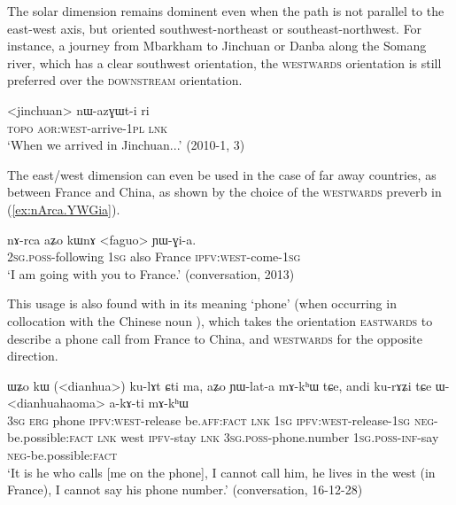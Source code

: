 The solar dimension remains dominent even when the path is not parallel to the east-west axis, but oriented southwest-northeast or southeast-northwest. For instance, a journey from Mbarkham to Jinchuan or Danba along the Somang river, which has a clear southwest orientation, the \textsc{westwards} orientation is still preferred over the \textsc{downstream} orientation.

\begin{exe}
\ex \label{ex:jinchuan.nazGWti}
\gll  <jinchuan> nɯ-azɣɯt-i ri \\
\textsc{topo} \textsc{aor}:\textsc{west}-arrive-\textsc{1pl} \textsc{lnk} \\
\glt `When we arrived in Jinchuan...' (2010-1, 3)
\end{exe}

The east/west dimension can even be used in the case of far away countries, as between France and China, as shown by the choice of the \textsc{westwards} preverb in (\ref{ex:nArca.YWGia}). 

\begin{exe}
\ex \label{ex:nArca.YWGia}
\gll nɤ-rca aʑo kɯnɤ <faguo> ɲɯ-ɣi-a. \\
\textsc{2sg}.\textsc{poss}-following \textsc{1sg} also France \textsc{ipfv}:\textsc{west}-come-\textsc{1sg} \\ 
\glt `I am going with you to France.' (conversation, 2013)
\end{exe}

This usage is also found with  in its meaning `phone' (when occurring in collocation with the Chinese noun ), which takes the orientation \textsc{eastwards} to describe a phone call from France to China, and \textsc{westwards} for the opposite direction.

\begin{exe}
\ex \label{ex:kulAt.YWlata}
\gll ɯʑo kɯ (<dianhua>) ku-lɤt ɕti ma, aʑo ɲɯ-lat-a mɤ-kʰɯ tɕe, andi ku-rɤʑi tɕe ɯ-<dianhuahaoma> a-kɤ-ti mɤ-kʰɯ \\
\textsc{3sg} \textsc{erg} phone \textsc{ipfv}:\textsc{west}-release be.\textsc{aff}:\textsc{fact} \textsc{lnk} \textsc{1sg} \textsc{ipfv}:\textsc{west}-release-\textsc{1sg} \textsc{neg}-be.possible:\textsc{fact} \textsc{lnk} west \textsc{ipfv}-stay \textsc{lnk} \textsc{3sg}.\textsc{poss}-phone.number \textsc{1sg}.\textsc{poss}-\textsc{inf}-say \textsc{neg}-be.possible:\textsc{fact} \\
\glt `It is he who calls [me on the phone], I cannot call him, he lives in the west (in France), I cannot say his phone number.' (conversation, 16-12-28)
\end{exe}

